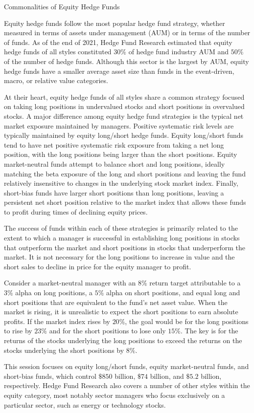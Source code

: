 \documentclass[11pt]{article}
\begin{document}
Commonalities of Equity Hedge Funds

Equity hedge funds follow the most popular hedge fund strategy, whether measured in terms of assets under management (AUM) or in terms of the number of funds. As of the end of 2021, Hedge Fund Research estimated that equity hedge funds of all styles constituted $30 \%$ of hedge fund industry AUM and $50 \%$ of the number of hedge funds. Although this sector is the largest by AUM, equity hedge funds have a smaller average asset size than funds in the event-driven, macro, or relative value categories.

At their heart, equity hedge funds of all styles share a common strategy focused on taking long positions in undervalued stocks and short positions in overvalued stocks. A major difference among equity hedge fund strategies is the typical net market exposure maintained by managers. Positive systematic risk levels are typically maintained by equity long/short hedge funds. Equity long/short funds tend to have net positive systematic risk exposure from taking a net long position, with the long positions being larger than the short positions. Equity market-neutral funds attempt to balance short and long positions, ideally matching the beta exposure of the long and short positions and leaving the fund relatively insensitive to changes in the underlying stock market index. Finally, short-bias funds have larger short positions than long positions, leaving a persistent net short position relative to the market index that allows these funds to profit during times of declining equity prices.

The success of funds within each of these strategies is primarily related to the extent to which a manager is successful in establishing long positions in stocks that outperform the market and short positions in stocks that underperform the market. It is not necessary for the long positions to increase in value and the short sales to decline in price for the equity manager to profit.

Consider a market-neutral manager with an $8 \%$ return target attributable to a $3 \%$ alpha on long positions, a $5 \%$ alpha on short positions, and equal long and short positions that are equivalent to the fund's net asset value. When the market is rising, it is unrealistic to expect the short positions to earn absolute profits. If the market index rises by $20 \%$, the goal would be for the long positions to rise by $23 \%$ and for the short positions to lose only $15 \%$. The key is for the returns of the stocks underlying the long positions to exceed the returns on the stocks underlying the short positions by $8 \%$.

This session focuses on equity long/short funds, equity market-neutral funds, and short-bias funds, which control $\$ 850$ billion, $\$ 74$ billion, and $\$ 5.2$ billion, respectively. Hedge Fund Research also covers a number of other styles within the equity category, most notably sector managers who focus exclusively on a particular sector, such as energy or technology stocks.
\end{document}
